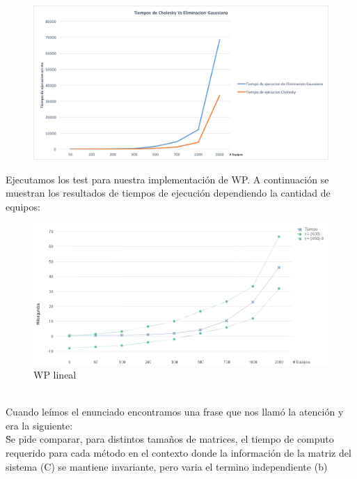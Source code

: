 \begin{figure}[H]
\centering
\includegraphics[width=1\textwidth]{IMG/tiemposgsvscholesky.png}
\end{figure}


Ejecutamos los test para nuestra implementación de WP. A continuación se muestran los resultados de tiempos de ejecución dependiendo la cantidad de equipos: \\


\begin{figure}[H]
\centering
\includegraphics[width=1\textwidth]{IMG/wp lineal.png}
\caption{WP lineal}
\label{fig:WP lineal}
\end{figure}

\\

Cuando leímos el enunciado encontramos una frase que nos llamó la atención y era la siguiente: \\

\"Se pide comparar, para distintos tamaños de matrices, el tiempo de computo requerido para cada método en el contexto donde la información de la matriz del sistema (C) se mantiene invariante, 
pero varia el termino independiente (b)\"\\

